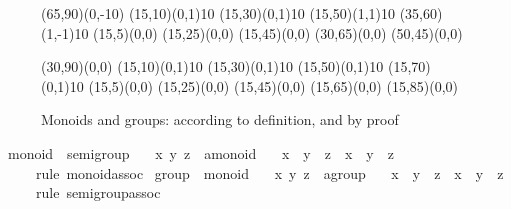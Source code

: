 \begin{isabellebody}
\begin{isamarkuptext}
 \begin{figure}[htbp]
   \begin{center}
     \small
     \unitlength 0.6mm
     \begin{picture}(65,90)(0,-10)
       \put(15,10){\line(0,1){10}} \put(15,30){\line(0,1){10}}
       \put(15,50){\line(1,1){10}} \put(35,60){\line(1,-1){10}}
       \put(15,5){\makebox(0,0){}}
       \put(15,25){\makebox(0,0){}}
       \put(15,45){\makebox(0,0){}}
       \put(30,65){\makebox(0,0){}} \put(50,45){\makebox(0,0){}}
     \end{picture}
     \hspace{4em}
     \begin{picture}(30,90)(0,0)
       \put(15,10){\line(0,1){10}} \put(15,30){\line(0,1){10}}
       \put(15,50){\line(0,1){10}} \put(15,70){\line(0,1){10}}
       \put(15,5){\makebox(0,0){}}
       \put(15,25){\makebox(0,0){}}
       \put(15,45){\makebox(0,0){}}
       \put(15,65){\makebox(0,0){}}
       \put(15,85){\makebox(0,0){}}
     \end{picture}
     \caption{Monoids and groups: according to definition, and by proof}
     \label{fig:monoid-group}
   \end{center}
 \end{figure}%
\end{isamarkuptext}%
\ monoid\ {\isacharless}\ semigroup\isanewline
{}\isanewline
\ \ \ x\ y\ z\ {\isacharcolon}{\isacharcolon}\ {\isachardoublequote}{\isacharprime}a{\isasymColon}monoid{\isachardoublequote}\isanewline
\ \ \ {\isachardoublequote}x\ {\isasymodot}\ y\ {\isasymodot}\ z\ {\isacharequal}\ x\ {\isasymodot}\ {\isacharparenleft}y\ {\isasymodot}\ z{\isacharparenright}{\isachardoublequote}\isanewline
\ \ \ \ \ {\isacharparenleft}rule\ monoid{\isachardot}assoc{\isacharparenright}\isanewline
{}\isanewline
\isanewline
{}\ group\ {\isacharless}\ monoid\isanewline
{}\isanewline
\ \ \ x\ y\ z\ {\isacharcolon}{\isacharcolon}\ {\isachardoublequote}{\isacharprime}a{\isasymColon}group{\isachardoublequote}\isanewline
\ \ \ {\isachardoublequote}x\ {\isasymodot}\ y\ {\isasymodot}\ z\ {\isacharequal}\ x\ {\isasymodot}\ {\isacharparenleft}y\ {\isasymodot}\ z{\isacharparenright}{\isachardoublequote}\isanewline
\ \ \ \ \ {\isacharparenleft}rule\ semigroup{\isachardot}assoc{\isacharparenright}\isanewline

\end{isabellebody}
